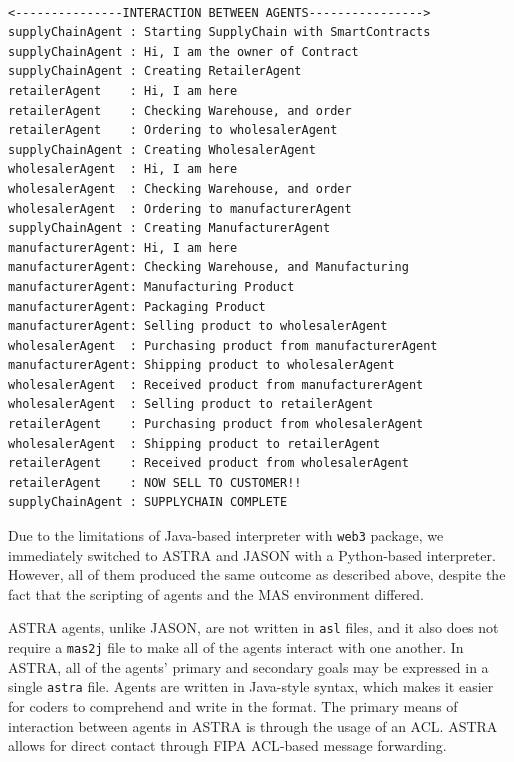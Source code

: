 \begin{lstlisting}[numbers=none, basicstyle=\ttfamily\tiny]

<---------------INTERACTION BETWEEN AGENTS---------------->
supplyChainAgent : Starting SupplyChain with SmartContracts
supplyChainAgent : Hi, I am the owner of Contract
supplyChainAgent : Creating RetailerAgent
retailerAgent    : Hi, I am here
retailerAgent    : Checking Warehouse, and order
retailerAgent    : Ordering to wholesalerAgent
supplyChainAgent : Creating WholesalerAgent
wholesalerAgent  : Hi, I am here
wholesalerAgent  : Checking Warehouse, and order
wholesalerAgent  : Ordering to manufacturerAgent
supplyChainAgent : Creating ManufacturerAgent
manufacturerAgent: Hi, I am here
manufacturerAgent: Checking Warehouse, and Manufacturing
manufacturerAgent: Manufacturing Product
manufacturerAgent: Packaging Product
manufacturerAgent: Selling product to wholesalerAgent
wholesalerAgent  : Purchasing product from manufacturerAgent
manufacturerAgent: Shipping product to wholesalerAgent
wholesalerAgent  : Received product from manufacturerAgent
wholesalerAgent  : Selling product to retailerAgent
retailerAgent    : Purchasing product from wholesalerAgent
wholesalerAgent  : Shipping product to retailerAgent
retailerAgent    : Received product from wholesalerAgent
retailerAgent    : NOW SELL TO CUSTOMER!!
supplyChainAgent : SUPPLYCHAIN COMPLETE
\end{lstlisting}

\vspace{.5cm}

Due to the limitations of Java-based interpreter with \texttt{web3} package, we immediately switched to \ac{ASTRA} and JASON with a Python-based interpreter. However, all of them produced the same outcome as described above, despite the fact that the scripting of agents and the \ac{MAS} environment differed.

\vspace{.5cm}

\ac{ASTRA} agents, unlike JASON, are not written in \texttt{asl} files, and it also does not require a \texttt{mas2j} file to make all of the agents interact with one another. In \ac{ASTRA}, all of the agents' primary and secondary goals may be expressed in a single \texttt{astra} file. Agents are written in Java-style syntax, which makes it easier for coders to comprehend and write in the format. The primary means of interaction between agents in \ac{ASTRA} is through the usage of an \ac{ACL}. \ac{ASTRA} allows for direct contact through \ac{FIPA} \ac{ACL}-based message forwarding.

